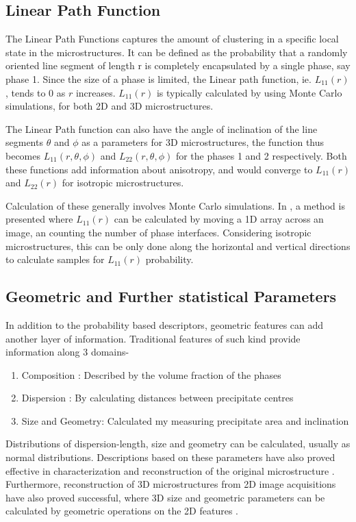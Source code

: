 \documentclass[12pt, a4paper]{report}
\begin{document}
\subsection{Linear Path Function}
The Linear Path Functions captures the amount of clustering in a specific local state in the microstructures. It can be defined as the probability that a randomly oriented line segment of length r is completely encapsulated by a single phase\cite{21lu1992lineal}, say phase 1. Since the size of a phase is limited, the Linear path function, ie. $L_{11}(r)$, tends to 0 as $r$ increases. $L_{11}(r)$ is typically calculated by using Monte Carlo simulations, for both 2D and 3D microstructures.

The Linear Path function can also have the angle of inclination of the line segments $\theta$ and $\phi$ as a parameters for 3D microstructures, the function thus becomes $L_{11}(r,\theta,\phi)$ and $L_{22}(r,\theta,\phi)$ for the phases 1 and 2 respectively. Both these functions add information about anisotropy, and would converge to $L_{11}(r)$ and $L_{22}(r)$ for isotropic microstructures.

Calculation of these generally involves Monte Carlo simulations. In \cite{15singh2008image}, a method is presented where $L_{11}(r)$ can be calculated by moving a 1D array across an image, an counting the number of phase interfaces. Considering isotropic microstructures, this can be only done along the horizontal and vertical directions to calculate samples for $L_{11}(r)$ probability.

\subsection{Geometric and Further statistical Parameters}
In addition to the probability based descriptors, geometric features can add another layer of information. Traditional features of such kind provide information along 3 domains- 
\begin{enumerate}
    \item Composition : Described by the volume fraction of the phases
    \item Dispersion :  By calculating distances between precipitate centres 
    \item Size and Geometry: Calculated my measuring precipitate area and inclination
\end{enumerate}

Distributions of dispersion-length, size and geometry can be calculated, usually as normal distributions. Descriptions based on these parameters have also proved effective in characterization and reconstruction of the original microstructure \cite{16xu2014descriptor}. Furthermore, reconstruction of 3D microstructures from 2D image acquisitions have also proved successful, where 3D size and geometric parameters can be calculated by geometric operations on the 2D features \cite{17xu2014descriptor2}.
\end{document}
